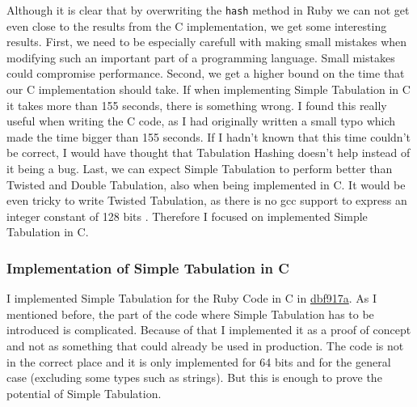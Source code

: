 \documentclass[oneside, 12pt]{article}
\theoremstyle{break}
\newcommand{\commitSimpleTabShort}{dbf917a}
\newcommand{\commitSimpleTab}{dbf917aa32f5e811da2d55c469580300aa430573}
\newcommand{\commitUrl}[2]{\href{https://github.com/Ana06/ruby/commit/#1}{#2}}
\begin{document}
Although it is clear that by overwriting the \lstinline{hash} method in Ruby we can not get even close to the results from the C implementation, we get some interesting results.
First, we need to be especially carefull with making small mistakes when modifying such an important part of a programming language.
Small mistakes could compromise performance.
Second, we get a higher bound on the time that our C implementation should take.
If when implementing Simple Tabulation in C it takes more than 155 seconds, there is something wrong.
I found this really useful when writing the C code, as I had originally written a small typo which made the time bigger than 155 seconds.
If I hadn't known that this time couldn't be correct, I would have thought that Tabulation Hashing doesn't help instead of it being a bug.
Last, we can expect Simple Tabulation to perform better than Twisted and Double Tabulation, also when being implemented in C.
It would be even tricky to write Twisted Tabulation, as there is no gcc support to express an integer constant of 128 bits \cite{gcc128}.
Therefore I focused on implemented Simple Tabulation in C.\\

\subsubsection{Implementation of Simple Tabulation in C}

I implemented Simple Tabulation for the Ruby Code in C in \commitUrl{\commitSimpleTab}{\commitSimpleTabShort}.
As I mentioned before, the part of the code where Simple Tabulation has to be introduced is complicated.
Because of that I implemented it as a proof of concept and not as something that could already be used in production.
The code is not in the correct place and it is only implemented for 64 bits and for the general case (excluding some types such as strings).
But this is enough to prove the potential of Simple Tabulation.\\
\end{document}
